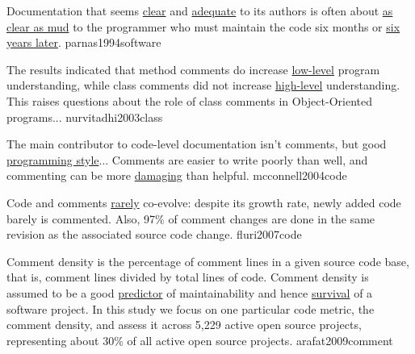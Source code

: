 \documentclass{article}
\begin{document}
  {Documentation that seems \ul{clear} and \ul{adequate} to its authors is often about \ul{as clear as mud} to the programmer who must maintain the code six months or \ul{six years later}.}
  {parnas1994software}


  {The results indicated that method comments do increase \ul{low-level} program understanding, while class comments did not increase \ul{high-level} understanding. This raises questions about the role of class comments in Object-Oriented programs...}
  {nurvitadhi2003class}

  {The main contributor to code-level documentation isn't comments, but good \ul{programming style}... Comments are easier to write poorly than well, and commenting can be more \ul{damaging} than helpful.}
  {mcconnell2004code}

  {Code and comments \ul{rarely} co-evolve: despite its growth rate, newly added code barely is commented. Also, 97\% of comment changes are done in the same revision as the associated source code change.}
  {fluri2007code}

  {Comment density is the percentage of comment lines in a given source code base, that is, comment lines divided by total lines of code. Comment density is assumed to be a good \ul{predictor} of maintainability and hence \ul{survival} of a software project. In this study we focus on one particular code metric, the comment density, and assess it across 5,229 active open source projects, representing about 30\% of all active open source projects.}
  {arafat2009comment}

\end{document}
